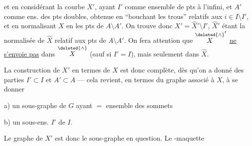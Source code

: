 et en considérant la courbe $X'$, ayant $I'$ comme ensemble de pts à l'infini, et $A'$ comme ens. des pts doubles, obtenue en ``bouchant les trous'' relatifs aux $i\in I\setminus I'$,  et en normalisant $X$ en les pts de $A\setminus A'$. On trouve donc $X'=\widehat X'\setminus I'$, $\widehat X'$ étant la normalisée de $\widehat X$ relatif aux pts de $A\setminus A'$. On fera attention que $\overset{\deleted{\wedge}}{X}'$ \uline{ne s'envoie pas} dans $\overset{\deleted{\wedge}}{X}$ (sauf si $I'=I$), mais seulement dans $\widehat X$.

 La construction de $X'$ en termes de $X$ est donc complète, dès qu'on a donné des parties $I'\subset I$ et $A'\subset A$ --- cela revient, en termes du  graphe associé à $X$, à se donner

\noindent a) un sous-graphe  de $G$ ayant $=$ ensemble des sommets

\noindent b) un sous-ens. $I'$ de $I$.

 Le graphe de $X'$ est donc le sous-graphe en question. Le -maquette
